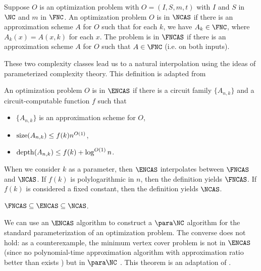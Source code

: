 \begin{definition}
  Suppose $O$ is an optimization problem with $O = (I, S, m, t)$ with $I$ and $S$ in $\NC$ and $m$ in $\FNC$.
  An optimization problem $O$ is in $\NCAS$ if there is an approximation scheme $A$ for $O$ such that for each $k$, we have $A_k \in \FNC$, where $A_k(x) = A(x, k)$ for each $x$.
  The problem is in $\FNCAS$ if there is an approximation scheme $A$ for $O$ such that $A \in \FNC$ (i.e. on both inputs).
\end{definition}

These two complexity classes lead us to a natural interpolation using the ideas of parameterized complexity theory.
This definition is adapted from \autocite[Definition~1.31]{fg06}

\begin{definition}[$\ENCAS$]
  An optimization problem $O$ is in $\ENCAS$ if there is a circuit family $\{A_{n, k}\}$ and a circuit-computable function $f$ such that
  \begin{itemize}
  \item $\{A_{n, k}\}$ is an approximation scheme for $O$,
  \item $\operatorname{size}(A_{n, k}) \leq f(k) n^{O(1)}$,
  \item $\operatorname{depth}(A_{n, k}) \leq f(k) + \log^{O(1)} n$.
  \end{itemize}
\end{definition}

When we consider $k$ as a parameter, then $\ENCAS$ interpolates between $\FNCAS$ and $\NCAS$.
If $f(k)$ is polylogarithmic in $n$, then the definition yields $\FNCAS$.
If $f(k)$ is considered a fixed constant, then the definition yields $\NCAS$.

\begin{proposition}\label{prop:encas}
  $\FNCAS \subseteq \ENCAS \subseteq \NCAS$.
\end{proposition}


We can use an $\ENCAS$ algorithm to construct a $\para \NC$ algorithm for the standard parameterization of an optimization problem.
The converse does not hold: as a counterexample, the minimum vertex cover problem is not in $\ENCAS$ (since no polynomial-time approximation algorithm with approximation ratio better than  exists \autocite[Theorem~8.1]{hastad01}) but in $\para \NC$ \autocite[Theorem~4.5]{bst15}.
This theorem is an adaptation of \autocite[Theorem~1.32]{fg06}.

